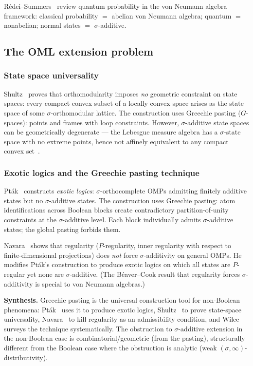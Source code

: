 R\'{e}dei--Summers~\cite{RedeiSummers2006} review quantum
probability in the von Neumann algebra framework: classical
probability $=$ abelian von Neumann algebra; quantum $=$ nonabelian;
normal states $=$ $\sigma$-additive.

\subsection{The OML extension problem}

\subsubsection{State space universality}

Shultz~\cite{Shultz1974} proves that orthomodularity imposes
\emph{no} geometric constraint on state spaces: every compact convex
subset of a locally convex space arises as the state space of some
$\sigma$-orthomodular lattice.  The construction uses Greechie
pasting ($G$-spaces): points and frames with loop constraints.
However, $\sigma$-additive state spaces can be geometrically
degenerate --- the Lebesgue measure algebra has a $\sigma$-state
space with no extreme points, hence not affinely equivalent to any
compact convex set~\cite[p.~327]{Shultz1974}.

\subsubsection{Exotic logics and the Greechie pasting technique}

Pt\'{a}k~\cite{Ptak1987} constructs \emph{exotic logics}:
$\sigma$-orthocomplete OMPs admitting finitely additive states but
no $\sigma$-additive states.  The construction uses Greechie
pasting: atom identifications across Boolean blocks create
contradictory partition-of-unity constraints at the
$\sigma$-additive level.  Each block individually admits
$\sigma$-additive states; the global pasting forbids them.

Navara~\cite{Navara1992} shows that regularity ($P$-regularity,
inner regularity with respect to finite-dimensional projections)
does \emph{not} force $\sigma$-additivity on general OMPs.  He
modifies Pt\'{a}k's construction to produce exotic logics on which
all states are $P$-regular yet none are $\sigma$-additive.  (The
B\'{e}aver--Cook result that regularity forces $\sigma$-additivity
is special to von Neumann algebras.)

\medskip\noindent
\textbf{Synthesis.}  Greechie pasting is the universal construction
tool for non-Boolean phenomena:
Pt\'{a}k~\cite{Ptak1987} uses it to produce exotic logics,
Shultz~\cite{Shultz1974} to prove state-space universality,
Navara~\cite{Navara1992} to kill regularity as an admissibility
condition, and Wilce~\cite{Wilce2009} surveys the technique
systematically.  The obstruction to $\sigma$-additive extension in
the non-Boolean case is combinatorial/geometric (from the pasting),
structurally different from the Boolean case where the obstruction
is analytic (weak $(\sigma,\infty)$-distributivity).

